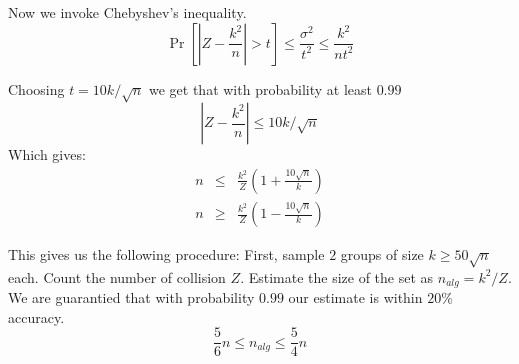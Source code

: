 \documentclass{article}
\begin{document}
\noindent  Now we invoke Chebyshev's inequality.
\begin{equation}
\Pr[|Z - \frac{k^2}{n}| > t] \le \frac{\sigma^2}{t^2} \le \frac{k^2}{nt^2}
\end{equation}

\noindent Choosing $t = 10k/\sqrt{n}$ we get that with probability at least $0.99$
\begin{equation}
|Z - \frac{k^2}{n}| \le 10k/\sqrt{n}
\end{equation}
Which gives:
\begin{eqnarray}
n &\le& \frac{k^2}{Z}(1+\frac{10\sqrt{n}}{k}) \\
n &\ge& \frac{k^2}{Z}(1-\frac{10\sqrt{n}}{k})
\end{eqnarray}


\noindent This gives us the following procedure:
First, sample $2$ groups of size $k \ge 50\sqrt{n}$ each.
Count the number of collision $Z$.
Estimate the size of the set as $n_{alg} = k^2/Z$.
We are guarantied that with probability $0.99$ our estimate is within $20\%$ accuracy.
\begin{equation}
\frac{5}{6}n \le n_{alg} \le \frac{5}{4}n
\end{equation}
\end{document}

